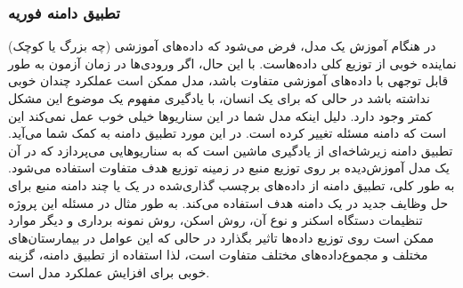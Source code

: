 \subsubsection{تطبیق دامنه فوریه}
در هنگام آموزش یک مدل، فرض می‌شود که داده‌های آموزشی (چه بزرگ یا کوچک) نماینده خوبی از توزیع کلی داده‌هاست.
با این حال، اگر ورودی‌ها در زمان آزمون به طور قابل توجهی با داده‌های آموزشی متفاوت باشد، مدل ممکن است عملکرد چندان خوبی نداشته باشد در حالی که برای یک انسان، با یادگیری مفهوم یک موضوع این مشکل کمتر وجود دارد.
دلیل اینکه مدل شما در این سناریوها خیلی خوب عمل نمی‌کند این است که دامنه مسئله تغییر کرده است. در این مورد تطبیق دامنه به کمک شما می‌آید. تطبیق دامنه زیرشاخه‌ای از یادگیری ماشین است که به سناریوهایی می‌پردازد که در آن یک مدل آموزش‌دیده بر روی توزیع منبع در زمینه توزیع هدف متفاوت استفاده می‌شود. به طور کلی، تطبیق دامنه از داده‌های برچسب گذاری‌شده در یک یا چند دامنه منبع برای حل وظایف جدید در یک دامنه هدف استفاده می‌کند.
\newline
به طور مثال در مسئله این پروژه تنظیمات دستگاه اسکنر و نوع آن، روش اسکن، روش نمونه برداری و دیگر موارد ممکن است روی توزیع داده‌ها تاثیر بگذارد در حالی که این عوامل در بیمارستان‌های مختلف و مجموع‌داده‌های مختلف متفاوت است، لذا استفاده از تطبیق دامنه، گزینه خوبی برای افزایش عملکرد مدل است.

